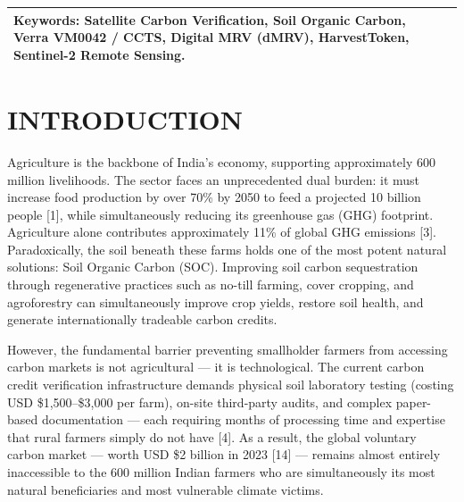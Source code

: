 \documentclass[10pt,a4paper]{article}
\begin{document}
\begin{tabularx}{\textwidth}{@{}p{} X@{}}
\addlinespace
\textbf{Keywords:} \newline
Satellite Carbon Verification, \newline
Soil Organic Carbon, \newline
Verra VM0042 / CCTS, \newline
Digital MRV (dMRV), \newline
HarvestToken, \newline
Sentinel-2 Remote Sensing.
& \\
\bottomrule
\end{tabularx}

\vspace{0.3cm}
\noindent{}
\vspace{0.5cm}

\section{INTRODUCTION}

Agriculture is the backbone of India's economy, supporting approximately 600 million livelihoods. The sector faces an unprecedented dual burden: it must increase food production by over 70\% by 2050 to feed a projected 10 billion people [1], while simultaneously reducing its greenhouse gas (GHG) footprint. Agriculture alone contributes approximately 11\% of global GHG emissions [3]. Paradoxically, the soil beneath these farms holds one of the most potent natural solutions: Soil Organic Carbon (SOC). Improving soil carbon sequestration through regenerative practices such as no-till farming, cover cropping, and agroforestry can simultaneously improve crop yields, restore soil health, and generate internationally tradeable carbon credits.

However, the fundamental barrier preventing smallholder farmers from accessing carbon markets is not agricultural — it is technological. The current carbon credit verification infrastructure demands physical soil laboratory testing (costing USD \$1,500--\$3,000 per farm), on-site third-party audits, and complex paper-based documentation — each requiring months of processing time and expertise that rural farmers simply do not have [4]. As a result, the global voluntary carbon market — worth USD \$2 billion in 2023 [14] — remains almost entirely inaccessible to the 600 million Indian farmers who are simultaneously its most natural beneficiaries and most vulnerable climate victims.
\end{document}
